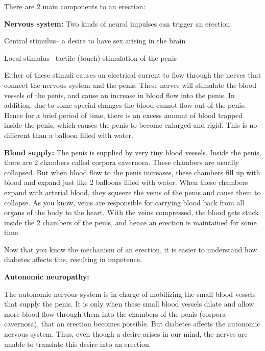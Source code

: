There are 2 main components to an erection:

\item \textbf{Nervous system:} Two kinds of neural impulses can trigger an erection.
 \item Central stimulus– a desire to have sex arising in the brain

 \item 
 Local stimulus– tactile (touch) stimulation of the penis

 Either of these stimuli causes an electrical current to flow through the nerves that connect the nervous system and the penis. These nerves will stimulate the blood vessels of the penis, and cause an increase in blood flow into the penis. In addition, due to some special changes the blood cannot flow out of the penis. Hence for a brief period of time, there is an excess amount of blood trapped inside the penis, which causes the penis to become enlarged and rigid. This is no different than a balloon filled with water.



 \item 
 \textbf{Blood supply:} The penis is supplied by very tiny blood vessels. Inside the penis, there are 2 chambers called corpora cavernosa. These chambers are usually collapsed. But when blood flow to the penis increases, these chambers fill up with blood and expand just like 2 balloons filled with water. When these chambers expand with arterial blood, they squeeze the veins of the penis and cause them to collapse. As you know, veins are responsible for carrying blood back from all organs of the body to the heart. With the veins compressed, the blood gets stuck inside the 2 chambers of the penis, and hence an erection is maintained for some time.

 Now that you know the mechanism of an erection, it is easier to understand how diabetes affects this, resulting in impotence.

 \item 
 \textbf{Autonomic neuropathy:}

 The autonomic nervous system is in charge of mobilizing the small blood vessels that supply the penis. It is only when these small blood vessels dilate and allow more blood flow through them into the chambers of the penis (corpora cavernosa), that an erection becomes possible. But diabetes affects the autonomic nervous system. Thus, even though a desire arises in our mind, the nerves are unable to translate this desire into an erection.


